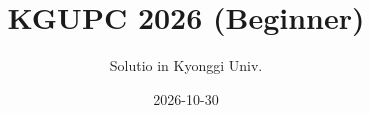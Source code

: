 \documentclass[11pt]{article}
\title{KGUPC 2026 (Beginner)}
\author{Solutio in Kyonggi Univ.}
\date{2026-10-30}
\begin{document}
\problemsetfrontmatter

\checkselectedproblem
\end{document}
